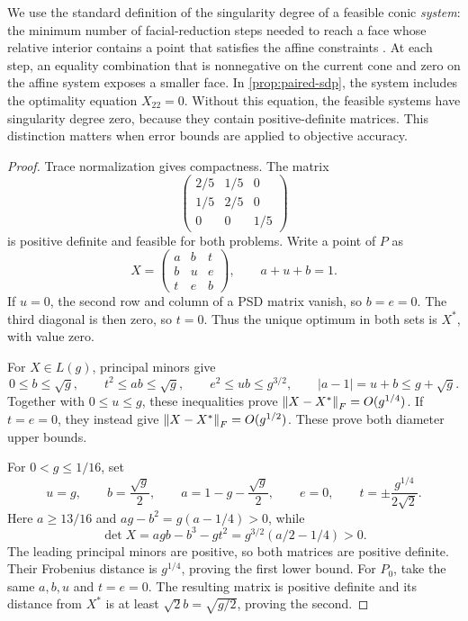 We use the standard definition of the singularity degree of a feasible
conic \emph{system}: the minimum number of facial-reduction steps needed
to reach a face whose relative interior contains a point that satisfies
the affine constraints \citep{drusvyatskiy2017,wakimuramatsu2013}.
At each step, an equality combination that is nonnegative on the
current cone and zero on the affine system exposes a smaller face. In \cref{prop:paired-sdp}, the system includes the
optimality equation $X_{22}=0$. Without this equation, the feasible
systems have singularity degree zero, because they contain
positive-definite matrices. This distinction matters when error bounds
are applied to objective accuracy.

\begin{proof}
Trace normalization gives compactness. The matrix
\[
 \begin{pmatrix}2/5&1/5&0\\1/5&2/5&0\\0&0&1/5\end{pmatrix}
\]
is positive definite and feasible for both problems. Write a point of
$P$ as
\begin{equation}
 X=\begin{pmatrix}a&b&t\\b&u&e\\t&e&b\end{pmatrix},
 \qquad a+u+b=1.
 \label{eq:fractional-coordinates}
\end{equation}
If $u=0$, the second row and column of a PSD matrix vanish, so
$b=e=0$. The third diagonal is then zero, so $t=0$. Thus the
unique optimum in both sets is $X^*$, with value zero.

For $X\in L(g)$, principal minors give
\begin{equation}
 0\leq b\leq\sqrt g,\qquad
 t^2\leq ab\leq\sqrt g,\qquad
 e^2\leq ub\leq g^{3/2},\qquad
 |a-1|=u+b\leq g+\sqrt g.
 \label{eq:fractional-minors}
\end{equation}
Together with $0\leq u\leq g$, these inequalities prove
$\left\lVert X-X^*\right\rVert_F=O(g^{1/4})$. If $t=e=0$, they instead give
$\left\lVert X-X^*\right\rVert_F=O(g^{1/2})$. These prove both diameter upper
bounds.

For $0<g\leq1/16$, set
\begin{equation}
 u=g,\qquad b=\frac{\sqrt g}{2},\qquad
 a=1-g-\frac{\sqrt g}{2},\qquad e=0,\qquad
 t=\pm\frac{g^{1/4}}{2\sqrt2}.
 \label{eq:fractional-chords}
\end{equation}
Here $a\geq13/16$ and $ag-b^2=g(a-1/4)>0$, while
\[
 \det X=agb-b^3-gt^2
         =g^{3/2}(a/2-1/4)>0.
\]
The leading principal minors are positive, so both matrices are
positive definite. Their Frobenius distance is $g^{1/4}$, proving
the first lower bound. For $P_0$, take the same $a,b,u$ and
$t=e=0$. The resulting matrix is positive definite and its distance
from $X^*$ is at least $\sqrt2b=\sqrt{g/2}$, proving the second.


\end{proof}
